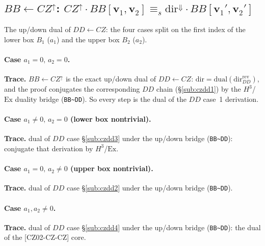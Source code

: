 \documentclass[a4paper]{article}
\newcommand{\lem}[1]{\textsf{[#1]}}      %
\begin{document}
\subsection{$BB\leftarrow CZ^{\uparrow}$: \; $CZ^{\uparrow}\cdot BB[\mathbf v_1,\mathbf v_2]\equiv_s \mathrm{dir}^{\Downarrow}\cdot BB[\mathbf v_1',\mathbf v_2']$}
\begin{center}\end{center}
\begin{center}\end{center}
The up/down dual of $DD\leftarrow CZ$: the four cases split on the first index of the
lower box $B_1$ ($a_1$) and the upper box $B_2$ ($a_2$).

\paragraph{Case $a_1=0,\,a_2=0$.}
\begin{center}\end{center}
\textbf{Trace.} $BB\leftarrow CZ^{\uparrow}$ is the exact up/down dual of $DD\leftarrow CZ$: $\mathrm{dir}=\mathrm{dual}(\mathrm{dir}_{DD}^{\mathrm{rev}})$, and the proof conjugates the corresponding $DD$ chain (\S\ref{sub:czdd1}) by the $H^3$/$\mathrm{Ex}$ duality bridge (\texttt{BB\textasciitilde DD}). So every step is the dual of the $DD$ case~1 derivation.

\paragraph{Case $a_1\neq0,\,a_2=0$ \;(lower box nontrivial).}
\begin{center}\end{center}
\textbf{Trace.} dual of $DD$ case \S\ref{sub:czdd3} under the up/down bridge (\texttt{BB\textasciitilde DD}): conjugate that derivation by $H^3$/$\mathrm{Ex}$.

\paragraph{Case $a_1=0,\,a_2\neq0$ \;(upper box nontrivial).}
\begin{center}\end{center}
\textbf{Trace.} dual of $DD$ case \S\ref{sub:czdd2} under the up/down bridge (\texttt{BB\textasciitilde DD}).

\paragraph{Case $a_1,a_2\neq0$.}
\begin{center}\end{center}
\textbf{Trace.} dual of $DD$ case \S\ref{sub:czdd4} under the up/down bridge (\texttt{BB\textasciitilde DD}): the dual of the \lem{CZ02-CZ-CZ} core.
\end{document}
